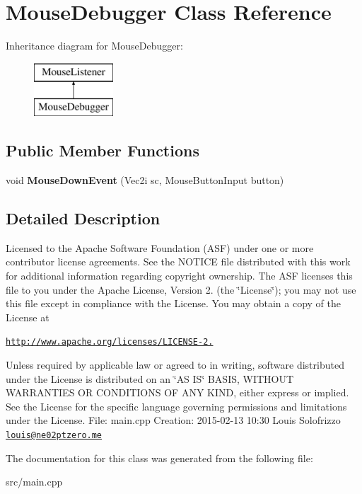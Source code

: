 \hypertarget{class_mouse_debugger}{\section{Mouse\+Debugger Class Reference}
\label{class_mouse_debugger}
}
Inheritance diagram for Mouse\+Debugger\+:\begin{figure}[H]
\begin{center}
\leavevmode
\includegraphics[height=2.000000cm]{class_mouse_debugger}
\end{center}
\end{figure}
\subsection*{Public Member Functions}
\begin{DoxyCompactItemize}
\item 
\hypertarget{class_mouse_debugger_a0d7f7e10a54cd1fc98370467805b24ac}{void {\bfseries Mouse\+Down\+Event} (Vec2i sc, Mouse\+Button\+Input button)}\label{class_mouse_debugger_a0d7f7e10a54cd1fc98370467805b24ac}

\end{DoxyCompactItemize}


\subsection{Detailed Description}
Licensed to the Apache Software Foundation (A\+S\+F) under one or more contributor license agreements. See the N\+O\+T\+I\+C\+E file distributed with this work for additional information regarding copyright ownership. The A\+S\+F licenses this file to you under the Apache License, Version 2. (the \char`\"{}\+License\char`\"{}); you may not use this file except in compliance with the License. You may obtain a copy of the License at

\href{http://www.apache.org/licenses/LICENSE-2.0}{\tt http\+://www.\+apache.\+org/licenses/\+L\+I\+C\+E\+N\+S\+E-\/2.}

Unless required by applicable law or agreed to in writing, software distributed under the License is distributed on an \char`\"{}\+A\+S I\+S\char`\"{} B\+A\+S\+I\+S, W\+I\+T\+H\+O\+U\+T W\+A\+R\+R\+A\+N\+T\+I\+E\+S O\+R C\+O\+N\+D\+I\+T\+I\+O\+N\+S O\+F A\+N\+Y K\+I\+N\+D, either express or implied. See the License for the specific language governing permissions and limitations under the License. File\+: main.\+cpp Creation\+: 2015-\/02-\/13 10\+:30 Louis Solofrizzo \href{mailto:louis@ne02ptzero.me}{\tt louis@ne02ptzero.\+me} 

The documentation for this class was generated from the following file\+:\begin{DoxyCompactItemize}
\item 
src/main.\+cpp\end{DoxyCompactItemize}
